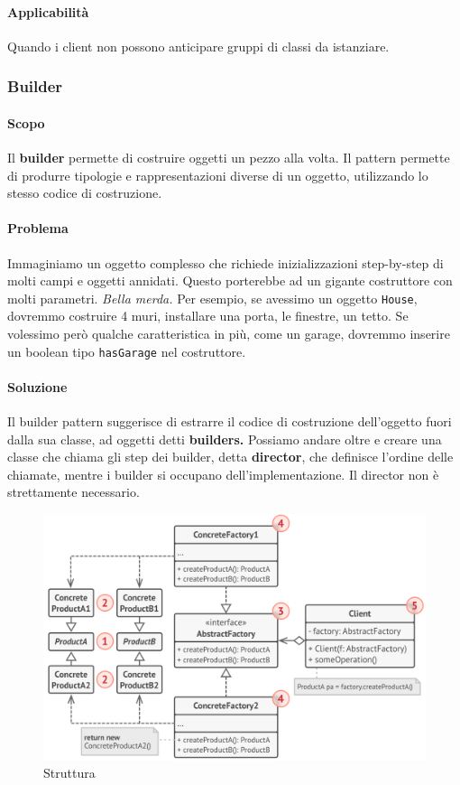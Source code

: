 \documentclass[11pt]{article}
\newcommand{\code}[1]{\texttt{#1}}
\begin{document}
\paragraph{Applicabilità}
Quando i client non possono anticipare gruppi di classi da istanziare.
\subsubsection{Builder}
\paragraph{Scopo}
Il \textbf{builder} permette di costruire oggetti un pezzo alla volta. Il pattern permette di produrre tipologie e rappresentazioni diverse di un oggetto, utilizzando lo stesso codice di costruzione.
\paragraph{Problema}
Immaginiamo un oggetto complesso che richiede inizializzazioni step-by-step di molti campi e oggetti annidati. Questo porterebbe ad un gigante costruttore con molti parametri. \textit{Bella merda.} Per esempio, se avessimo un oggetto \code{House}, dovremmo costruire 4 muri, installare una porta, le finestre, un tetto. Se volessimo però qualche caratteristica in più, come un garage, dovremmo inserire un boolean tipo \code{hasGarage} nel costruttore.
\paragraph{Soluzione}
Il builder pattern suggerisce di estrarre il codice di costruzione dell'oggetto fuori dalla sua classe, ad oggetti detti \textbf{builders.} Possiamo andare oltre e creare una classe che chiama gli step dei builder, detta \textbf{director}, che definisce l'ordine delle chiamate, mentre i builder si occupano dell'implementazione. 
Il director non è strettamente necessario.
\begin{figure}[H]
    \centering
    \includegraphics[width=\linewidth]{res/teoria/AbstractFactory.png}
    \caption{Struttura}
\end{figure}
\end{document}
